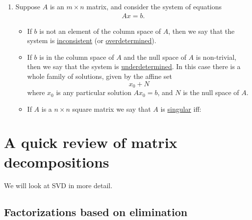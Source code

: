 \begin{enumerate}
\item Suppose $A$ is an $m\times n$ matrix, and consider the system of equations 
    \begin{align*}
        Ax = b.
    \end{align*}
    \begin{itemize}
        \item If $b$ is not an element of the column space of $A$, then we say that the system is \underline{inconsistent} (or \underline{overdetermined}). \\
        \item If $b$ is in the column space of $A$ and the null space of $A$ is non-trivial, then we say that the system is \underline{underdetermined}. In this case there is a whole family of solutions, given by the affine set
            $$x_0 + N$$
        where $x_0$ is any particular solution $Ax_0 = b$, and $N$ is the null space of $A$. \\
        \item If $A$ is a $n\times n$ square matrix we say that $A$ is \underline{singular} iff:
    \end{itemize}
\end{enumerate}

\newpage
\section{A quick review of matrix decompositions}

We will look at SVD in more detail.

\subsection{Factorizations based on elimination}

